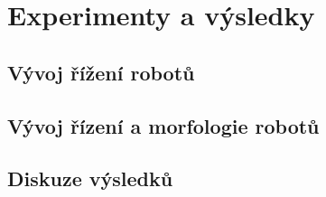 
\chapter{Experimenty a výsledky}

\section{Vývoj řížení robotů}

\section{Vývoj řízení a morfologie robotů}

\section{Diskuze výsledků}

